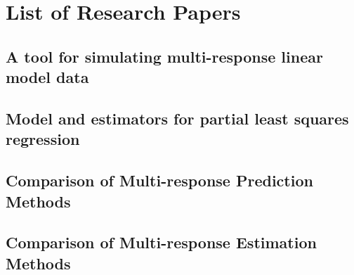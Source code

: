 \documentclass[11pt,twoside,openright,titlepage,
  headinclude,footinclude,BCOR=5mm,
  numbers=noenddot,cleardoublepage=empty,
  tablecaptionabove, dottedtoc,
  bibliography=totoc]{scrreprt}
\begin{document}
  \renewcommand\bibname{References}
  


\nocite{*}

\appendix
\part*{List of Research Papers}
\par\chapter{A tool for simulating multi-response linear model data}
\cleardoublepage

\par\chapter{Model and estimators for partial least squares regression}
\cleardoublepage

\par\chapter{Comparison of Multi-response Prediction Methods}
\cleardoublepage

\par\chapter{Comparison of Multi-response Estimation Methods}
\cleardoublepage


\end{document}
